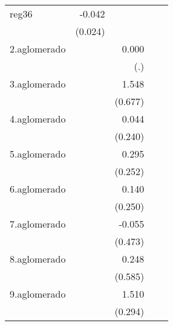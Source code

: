 {\begin{longtable}{l*{4}{D{.}{.}{-1}}}
\addlinespace
reg36       &      -0.042         &                     &                     &                     \\
            &     (0.024)         &                     &                     &                     \\
\addlinespace
2.aglomerado&                     &       0.000         &                     &                     \\
            &                     &         (.)         &                     &                     \\
\addlinespace
3.aglomerado&                     &       1.548\sym{*}  &                     &                     \\
            &                     &     (0.677)         &                     &                     \\
\addlinespace
4.aglomerado&                     &       0.044         &                     &                     \\
            &                     &     (0.240)         &                     &                     \\
\addlinespace
5.aglomerado&                     &       0.295         &                     &                     \\
            &                     &     (0.252)         &                     &                     \\
\addlinespace
6.aglomerado&                     &       0.140         &                     &                     \\
            &                     &     (0.250)         &                     &                     \\
\addlinespace
7.aglomerado&                     &      -0.055         &                     &                     \\
            &                     &     (0.473)         &                     &                     \\
\addlinespace
8.aglomerado&                     &       0.248         &                     &                     \\
            &                     &     (0.585)         &                     &                     \\
\addlinespace
9.aglomerado&                     &       1.510\sym{***}&                     &                     \\
            &                     &     (0.294)         &                     &                     \\

\end{longtable}}
